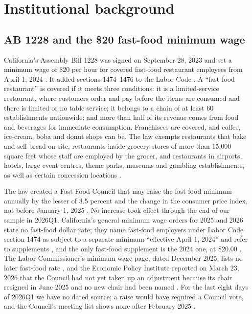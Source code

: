 \section{Institutional background}
\label{sec:background}

\subsection{AB 1228 and the \$20 fast-food minimum wage}

California's Assembly Bill 1228 was signed on September 28, 2023 and set a minimum wage of \$20
per hour for covered fast-food restaurant employees from April 1, 2024
\citep{dir2026fastfoodcouncil,dir2024mwffsupplement}. It added sections 1474--1476 to the Labor
Code \citep{dir2024fastfoodfaq}. A ``fast food restaurant'' is covered if it meets three
conditions: it is a limited-service restaurant, where customers order and pay before the items
are consumed and there is limited or no table service; it belongs to a chain of at least 60
establishments nationwide; and more than half of its revenue comes from food and beverages for
immediate consumption. Franchisees are covered, and coffee, ice-cream, boba and donut shops can
be. The law exempts restaurants that bake and sell bread on site, restaurants inside grocery
stores of more than 15,000 square feet whose staff are employed by the grocer, and restaurants
in airports, hotels, large event centres, theme parks, museums and gambling establishments, as
well as certain concession locations \citep{dir2024fastfoodfaq}.

The law created a Fast Food Council that may raise the fast-food minimum annually by the lesser
of 3.5 percent and the change in the consumer price index, not before January 1, 2025
\citep{dir2024fastfoodfaq}. No increase took effect through the end of our sample in 2026Q1.
California's general minimum wage orders for 2025 and 2026 state no fast-food dollar rate; they
name fast-food employers under Labor Code section 1474 as subject to a separate minimum
``effective April 1, 2024'' and refer to supplements \citep{dir2026mw}, and the only fast-food
supplement is the 2024 one, at \$20.00 \citep{dir2024mwffsupplement}. The Labor Commissioner's
minimum-wage page, dated December 2025, lists no later fast-food rate
\citep{dir2025minimumwage}, and the Economic Policy Institute reported on March 23, 2026 that
the Council had not yet taken up an adjustment because its chair resigned in June 2025 and no
new chair had been named \citep{bivens2026adjusting}. For the last eight days of 2026Q1 we have
no dated source; a raise would have required a Council vote, and the Council's meeting list
shows none after February 2025 \citep{dir2026fastfoodcouncil}.

